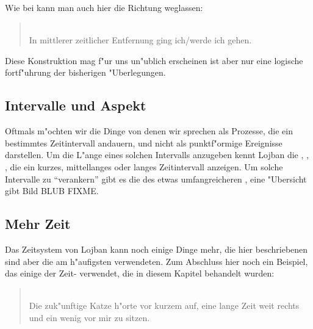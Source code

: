 Wie bei  kann man auch hier die Richtung weglassen:
\begin{quote}
 \\
In mittlerer zeitlicher Entfernung ging ich/werde ich gehen.
\end{quote}
Diese Konstruktion mag f"ur uns un"ublich erscheinen ist aber nur eine logische fortf"uhrung der bisherigen "Uberlegungen.

\subsection{Intervalle und Aspekt}
Oftmals m"ochten wir die Dinge von denen wir sprechen als Prozesse, die ein bestimmtes Zeitintervall andauern, und nicht als punktf"ormige
Ereignisse darstellen. Um die L"ange eines solchen Intervalls anzugeben kennt Lojban die  , , ,
die ein kurzes, mittellanges oder langes Zeitintervall anzeigen.
Um solche Intervalle zu ``verankern'' gibt es die  des etwas umfangreicheren , eine "Ubersicht gibt Bild BLUB FIXME.

\subsection{Mehr Zeit}
Das Zeitsystem von Lojban kann noch einige Dinge mehr, die hier beschriebenen sind aber die am h"aufigsten verwendeten.
Zum Abschluss hier noch ein Beispiel, das einige der Zeit- verwendet, die in diesem Kapitel behandelt wurden:
\begin{quote}
 \\
Die zuk"unftige Katze h"orte vor kurzem auf, eine lange Zeit weit rechts und ein wenig vor mir zu sitzen.
\end{quote}

